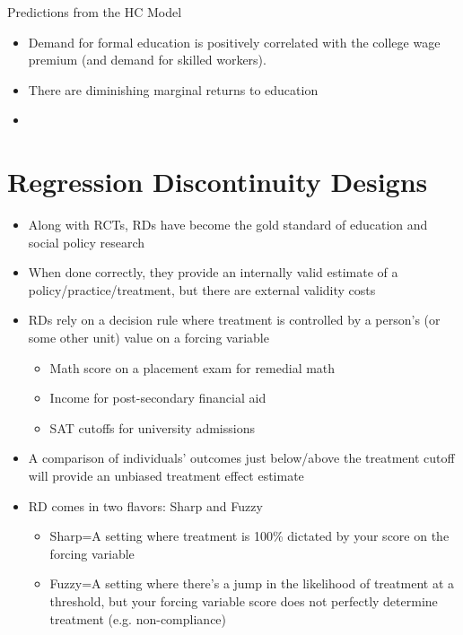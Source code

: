 \documentclass{beamer}
\begin{document}
\begin{frame}[<+->]{Predictions from the HC Model}
    \begin{itemize}
        \item Demand for formal education is positively correlated with the college wage premium (and demand for skilled workers). 
        \item There are diminishing marginal returns to education 
        \item 
    \end{itemize}
    
\end{frame}



\section{Regression Discontinuity Designs}
\frame{\sectionpage}

\begin{frame}[<+->]
	\begin{itemize}
		\item Along with RCTs, RDs have become the gold standard of education and social policy research
		\item When done correctly, they provide an internally valid estimate of a policy/practice/treatment, but there are external validity costs
		\item RDs rely on a decision rule where treatment is controlled by a person's (or some other unit) value on a forcing variable \medskip
		\begin{itemize}
			\item Math score on a placement exam for remedial math
			\item Income for post-secondary financial aid
			\item SAT cutoffs for university admissions
		\end{itemize}
			\item A comparison of individuals' outcomes just below/above the treatment cutoff will provide an unbiased treatment effect estimate
			\item RD comes in two flavors: Sharp and Fuzzy
			\begin{itemize}
				\item Sharp=A setting where treatment is 100\% dictated by your score on the forcing variable
				\item Fuzzy=A setting where there's a jump in the likelihood of treatment at a threshold, but your forcing variable score does not perfectly determine treatment (e.g. non-compliance)
			\end{itemize}
		\end{itemize}

\end{frame}
\end{document}
